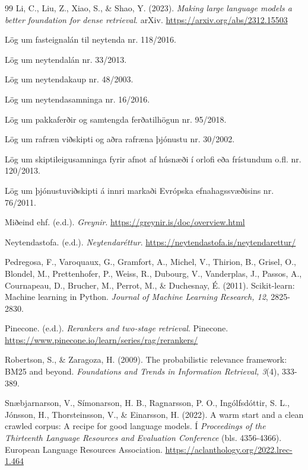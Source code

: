 \documentclass[fleqn]{report}
\begin{document}
\begin{thebibliography}{99}
Li, C., Liu, Z., Xiao, S., \& Shao, Y. (2023). \textit{Making large language models a better foundation for dense retrieval}. arXiv. \url{https://arxiv.org/abs/2312.15503}

Lög um fasteignalán til neytenda nr. 118/2016.

Lög um neytendalán nr. 33/2013.

Lög um neytendakaup nr. 48/2003.

Lög um neytendasamninga nr. 16/2016.

Lög um pakkaferðir og samtengda ferðatilhögun nr. 95/2018.

Lög um rafræn viðskipti og aðra rafræna þjónustu nr. 30/2002.

Lög um skiptileigusamninga fyrir afnot af húsnæði í orlofi eða frístundum o.fl. nr. 120/2013.

Lög um þjónustuviðskipti á innri markaði Evrópska efnahagssvæðisins nr. 76/2011.

Miðeind ehf. (e.d.). \textit{Greynir}. \url{https://greynir.is/doc/overview.html}

Neytendastofa. (e.d.). \textit{Neytendaréttur}. \url{https://neytendastofa.is/neytendarettur/}

Pedregosa, F., Varoquaux, G., Gramfort, A., Michel, V., Thirion, B., Grisel, O., Blondel, M., Prettenhofer, P., Weiss, R., Dubourg, V., Vanderplas, J., Passos, A., Cournapeau, D., Brucher, M., Perrot, M., \& Duchesnay, É. (2011). Scikit-learn: Machine learning in Python. \textit{Journal of Machine Learning Research, 12}, 2825-2830.

Pinecone. (e.d.). \textit{Rerankers and two-stage retrieval}. Pinecone. \url{https://www.pinecone.io/learn/series/rag/rerankers/}

Robertson, S., \& Zaragoza, H. (2009). The probabilistic relevance framework: BM25 and beyond. \textit{Foundations and Trends in Information Retrieval, 3}(4), 333-389.

Snæbjarnarson, V., Símonarson, H. B., Ragnarsson, P. O., Ingólfsdóttir, S. L., Jónsson, H., Thorsteinsson, V., \& Einarsson, H. (2022). A warm start and a clean crawled corpus: A recipe for good language models. Í \textit{Proceedings of the Thirteenth Language Resources and Evaluation Conference} (bls. 4356-4366). European Language Resources Association. \url{https://aclanthology.org/2022.lrec-1.464}


\end{thebibliography}
\end{document}
